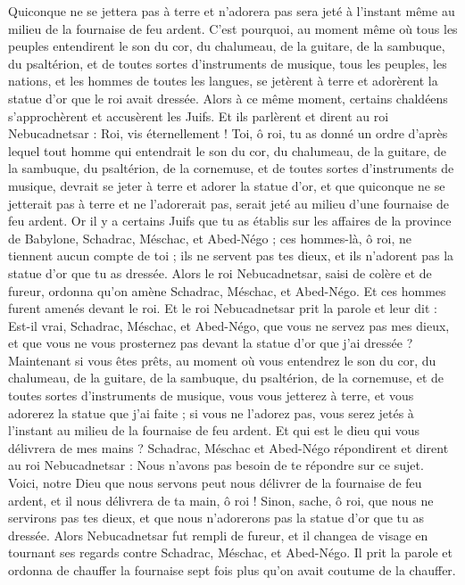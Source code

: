 \begin{multicols}{2}
Quiconque ne se jettera pas à terre et n'adorera pas sera jeté à l'instant même au milieu de la fournaise de feu ardent.
C'est pourquoi, au moment même où tous les peuples entendirent le son du cor, du chalumeau, de la guitare, de la sambuque, du psaltérion, et de toutes sortes d'instruments de musique, tous les peuples, les nations, et les hommes de toutes les langues, se jetèrent à terre et adorèrent la statue d'or que le roi avait dressée.
Alors à ce même moment, certains chaldéens s'approchèrent et accusèrent les Juifs.
Et ils parlèrent et dirent au roi Nebucadnetsar : Roi, vis éternellement !
Toi, ô roi, tu as donné un ordre d'après lequel tout homme qui entendrait le son du cor, du chalumeau, de la guitare, de la sambuque, du psaltérion, de la cornemuse, et de toutes sortes d'instruments de musique, devrait se jeter à terre et adorer la statue d'or,
et que quiconque ne se jetterait pas à terre et ne l'adorerait pas, serait jeté au milieu d'une fournaise de feu ardent.
Or il y a certains Juifs que tu as établis sur les affaires de la province de Babylone, Schadrac, Méschac, et Abed-Négo ; ces hommes-là, ô roi, ne tiennent aucun compte de toi ; ils ne servent pas tes dieux, et ils n'adorent pas la statue d'or que tu as dressée.
Alors le roi Nebucadnetsar, saisi de colère et de fureur, ordonna qu'on amène Schadrac, Méschac, et Abed-Négo. Et ces hommes furent amenés devant le roi.
Et le roi Nebucadnetsar prit la parole et leur dit : Est-il vrai, Schadrac, Méschac, et Abed-Négo, que vous ne servez pas mes dieux, et que vous ne vous prosternez pas devant la statue d'or que j'ai dressée ?
Maintenant si vous êtes prêts, au moment où vous entendrez le son du cor, du chalumeau, de la guitare, de la sambuque, du psaltérion, de la cornemuse, et de toutes sortes d'instruments de musique, vous vous jetterez à terre, et vous adorerez la statue que j'ai faite ; si vous ne l'adorez pas, vous serez jetés à l'instant au milieu de la fournaise de feu ardent. Et qui est le dieu qui vous délivrera de mes mains ?
Schadrac, Méschac et Abed-Négo répondirent et dirent au roi Nebucadnetsar : Nous n'avons pas besoin de te répondre sur ce sujet.
Voici, notre Dieu que nous servons peut nous délivrer de la fournaise de feu ardent, et il nous délivrera de ta main, ô roi !
Sinon, sache, ô roi, que nous ne servirons pas tes dieux, et que nous n'adorerons pas la statue d'or que tu as dressée.
Alors Nebucadnetsar fut rempli de fureur, et il changea de visage en tournant ses regards contre Schadrac, Méschac, et Abed-Négo. Il prit la parole et ordonna de chauffer la fournaise sept fois plus qu'on avait coutume de la chauffer.

\end{multicols}
